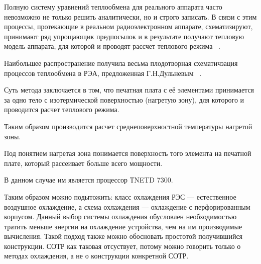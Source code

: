 Полную систему уравнений теплообмена для реального аппарата часто
невозможно не только решить аналитически, но и строго записать. В
связи с этим процессы, протекающие в реальном радиоэлектронном
аппарате, схематизируют, принимают ряд упрощающик предпосылок и в
результате получают тепловую модель аппарата, для которой и проводят
рассчет теплового режима ~\cite{Rotkop1976}.

Наибольшее распространение получила весьма плодотворная схематичзация
процессов теплообмена в РЭА, предложенная Г.Н.Дульневым
~\cite{Dulnev1968}.

Суть метода заключается в том, что печатная плата с её элементами
принимается за одно тело с изотермической поверхностью (нагретую
зону), для которого и проводится расчет теплового режима.

Таким образом производится расчет среднеповерхностной температуры
нагретой зоны.

Под понятием нагретая зона понимается поверхность того элемента на
печатной плате, который рассеивает больше всего мощности.

В данном случае им является процессор ТNETD 7300.


Таким образом можно подытожить: класс охлаждения РЭС — естественное
воздушное охлаждение, а схема охлаждения — охлаждение с
перфорированным корпусом. Данный выбор системы охлаждения обусловлен
необходимостью тратить меньше энергии на охлаждение устройства, чем на
им производимые вычисления. Такой подход также можно обосновать
простотой получившийся конструкции. СОТР как таковая отсуствует,
потому можно говорить только о методах охлаждения, а не о конструкции
конкретной СОТР.

\newpage
